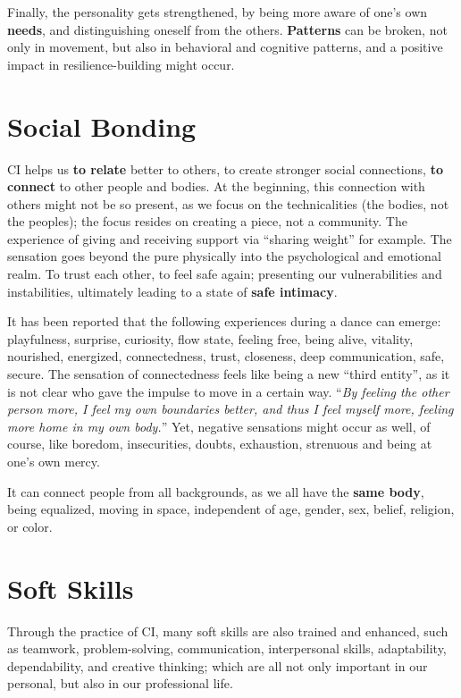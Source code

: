 Finally, the personality gets strengthened, by being more aware of one's own \textbf{needs}, and distinguishing oneself from the others.
\textbf{Patterns} can be broken, not only in movement, but also in behavioral and cognitive patterns, and a positive impact in resilience-building might occur.

\section{Social Bonding}\label{sec:social-bonding}

CI helps us \textbf{to relate} better to others, to create stronger social connections, \textbf{to connect} to other people and bodies.
At the beginning, this connection with others might not be so present, as we focus on the technicalities (the bodies, not the peoples); the focus resides on creating a piece, not a community.
The experience of giving and receiving support via ``sharing weight'' for example.
The sensation goes beyond the pure physically into the psychological and emotional realm.
To trust each other, to feel safe again; presenting our vulnerabilities and instabilities, ultimately leading to a state of \textbf{safe intimacy}.

It has been reported that the following experiences during a dance can emerge: playfulness, surprise, curiosity, flow state, feeling free, being alive, vitality, nourished, energized, connectedness, trust, closeness, deep communication, safe, secure.
The sensation of connectedness feels like being a new ``third entity'', as it is not clear who gave the impulse to move in a certain way.
``\textit{By feeling the other person more, I feel my own boundaries better, and thus I feel myself more, feeling more home in my own body.}''
Yet, negative sensations might occur as well, of course, like boredom, insecurities, doubts, exhaustion, strenuous and being at one's own mercy.

It can connect people from all backgrounds, as we all have the \textbf{same body}, being equalized, moving in space, independent of age, gender, sex, belief, religion, or color.

\section{Soft Skills}\label{sec:soft-skills}

Through the practice of CI, many soft skills are also trained and enhanced, such as teamwork, problem-solving, communication, interpersonal skills, adaptability, dependability, and creative thinking; which are all not only important in our personal, but also in our professional life.

